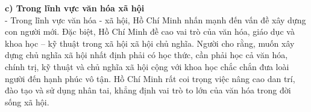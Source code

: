 \documentclass[12pt,a4paper]{article}
\begin{document}
\textbf{c) Trong lĩnh vực văn hóa xã hội}\\
- Trong lĩnh vực văn hóa - xã hội, Hồ Chí Minh nhấn mạnh đến vấn đề xây dựng con người mới. Đặc biệt, Hồ Chí Minh đề cao vai trò của văn hóa, giáo dục và khoa học – kỹ thuật trong xã hội xã hội chủ nghĩa. Người cho rằng, muốn xây dựng chủ nghĩa xã hội nhất định phải có học thức, cần phải học cả văn hóa, chính trị, kỹ thuật và chủ nghĩa xã hội cộng với khoa học chắc chắn đưa loài người đến hạnh phúc vô tận. Hồ Chí Minh rất coi trọng việc nâng cao dan trí, đào tạo và sử dụng nhân tai, khẳng định vai trò to lớn của văn hóa trong đời sống xã hội.
\end{document}
